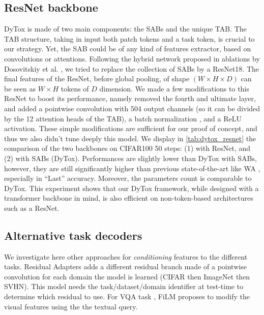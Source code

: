 

%   

\subsection{ResNet backbone}

DyTox is made of two main components: the SABs and the unique TAB. The TAB structure, taking in
input both patch tokens and a task token, is crucial to our strategy. Yet, the SAB could be of any
kind of features extractor, based on convolutions or attentions. Following the hybrid network
proposed in ablations by Dosovitskiy et al. \cite{dosovitskiy2020vit}, we tried to replace the
collection of SABs by a ResNet18. The final features of the ResNet, before global pooling, of shape
$(W \times H \times D)$ can be seen as $W \times H$ tokens of $D$ dimension. We made a few
modifications to this ResNet to boost its performance, namely removed the fourth and ultimate layer,
and added a pointwise convolution with 504 output channels (so it can be divided by the 12 attention
heads of the TAB), a batch normalization \cite{ioffe2015batchnorm}, and a ReLU activation. These
simple modifications are sufficient for our proof of concept, and thus we also didn't tune deeply
this model. We display in \autoref{tab:dytox_resnet} the comparison of the two backbones on CIFAR100 50
steps: (1) with ResNet, and (2) with SABs (DyTox). Performances are slightly lower than DyTox with
SABs, however, they are still significantly higher than previous state-of-the-art like WA
\cite{zhao2020weightalignement}, especially in ``Last'' accuracy. Moreover, the parameters count is
comparable to DyTox. This experiment shows that our DyTox framework, while designed with a
transformer backbone in mind, is also efficient on non-token-based architectures such as a ResNet.



\subsection{Alternative task decoders}

We investigate here other approaches for \textit{conditioning} features to the different tasks.
Residual Adapters \cite{rebuffi2017residualadapters} adds a different residual branch made of a
pointwise convolution for each domain the model is learned (\eg CIFAR then ImageNet then SVHN). This
model needs the task/dataset/domain identifier at test-time to determine which residual to use. For
VQA task \cite{antol2015vqa}, FiLM \cite{perez2018film} proposes to modify the visual features using
the the textual query.

